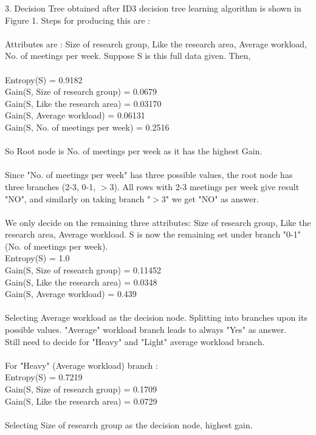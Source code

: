 \documentclass[a4paper,11pt]{article}
\begin{document}
\begin{mlsolution}
3. Decision Tree obtained after ID3 decision tree learning algorithm is shown in Figure 1. Steps for producing this are :
\\\\Attributes are : Size of research group, Like the research area, Average workload, No. of meetings  per week. Suppose S is this full data given. Then, \\\\Entropy(S) = 0.9182\\
Gain(S, Size of research group) = 0.0679\\
Gain(S, Like the research area) = 0.03170\\
Gain(S, Average workload) = 0.06131\\
Gain(S, No. of meetings  per week) = 0.2516\\\\So Root node is No. of meetings per week as it has the highest Gain.\\\\Since "No. of meetings per week" has three possible values, the root node has three branches (2-3, 0-1, $>$3). All rows with 2-3 meetings per week give result "NO", and similarly on taking branch "$>$3" we get "NO" as answer. \\\\We only decide on the remaining three attributes: Size of research group, Like the research area, Average workload. S is now the remaining set under branch "0-1" (No. of meetings per week).\\
Entropy(S) = 1.0\\
Gain(S, Size of research group) = 0.11452\\
Gain(S, Like the research area) = 0.0348\\
Gain(S, Average workload) = 0.439\\\\Selecting Average workload as the decision node. Splitting into branches upon its possible values. "Average" workload branch leads to always "Yes" as answer.\\Still need to decide for "Heavy" and "Light" average workload branch.\\\\For "Heavy" (Average workload) branch :\\Entropy(S) = 0.7219\\
Gain(S, Size of research group) = 0.1709\\
Gain(S, Like the research area) = 0.0729\\\\Selecting Size of research group as the decision node, highest gain.

\end{mlsolution}
\end{document}

